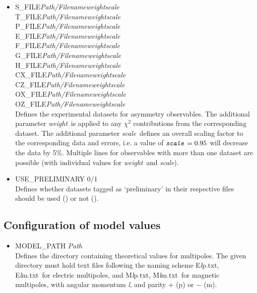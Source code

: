 \documentclass[a4paper,10pt]{article}
\def\bl{\phantom{0}}
\def\tt{\ttfamily}
\def\rm{\rmfamily}
\begin{document}
\begin{itemize}
\item
\tt S\_FILE\bl\bl \textit{Path/Filename}\bl \textit{weight}\bl \textit{scale}\rm\\
\tt T\_FILE\bl\bl \textit{Path/Filename}\bl \textit{weight}\bl \textit{scale}\rm\\
\tt P\_FILE\bl\bl \textit{Path/Filename}\bl \textit{weight}\bl \textit{scale}\rm\\
\tt E\_FILE\bl\bl \textit{Path/Filename}\bl \textit{weight}\bl \textit{scale}\rm\\
\tt F\_FILE\bl\bl \textit{Path/Filename}\bl \textit{weight}\bl \textit{scale}\rm\\
\tt G\_FILE\bl\bl \textit{Path/Filename}\bl \textit{weight}\bl \textit{scale}\rm\\
\tt H\_FILE\bl\bl \textit{Path/Filename}\bl \textit{weight}\bl \textit{scale}\rm\\
\tt CX\_FILE\bl   \textit{Path/Filename}\bl \textit{weight}\bl \textit{scale}\rm\\
\tt CZ\_FILE\bl   \textit{Path/Filename}\bl \textit{weight}\bl \textit{scale}\rm\\
\tt OX\_FILE\bl   \textit{Path/Filename}\bl \textit{weight}\bl \textit{scale}\rm\\
\tt OZ\_FILE\bl   \textit{Path/Filename}\bl \textit{weight}\bl \textit{scale}\rm\\
Defines the experimental datasets for asymmetry observables. The additional
parameter \tt\textit{weight}\rm\ is applied to any $\chi^2$ contributions from the corresponding dataset. The additional
parameter \tt\textit{scale}\rm\ defines an overall scaling factor to the corresponding data and errors, i.e.
a value of $\mbox{\tt\textit{scale}\rm} = 0.95$ will decrease the data by 5\%.
Multiple lines for observables with more than one dataset are possible (with individual values for
\tt\textit{weight}\rm\ and \tt\textit{scale}\rm).

\item
\tt USE\_PRELIMINARY 0/1\rm\\
Defines whether datasets tagged as `preliminary' in their respective files should be used (\tt1\rm) or not (\tt0\rm).
\end{itemize}

\subsection{Configuration of model values}

\begin{itemize}
\item
\tt MODEL\_PATH \textit{Path}\rm\\
Defines the directory containing theoretical values for multipoles. The given directory must hold text files
following the naming scheme \tt E\textit{l}p.txt\rm,
\tt E\textit{l}m.txt\rm\ 
for electric multipoles, and
\tt M\textit{l}p.txt\rm,
\tt M\textit{l}m.txt\rm\ 
for magnetic multipoles, with angular momentum \tt\textit{l}\rm, and parity 
$+$ (\tt p\rm) or $-$ (\tt m\rm).

\end{itemize}
\end{document}
